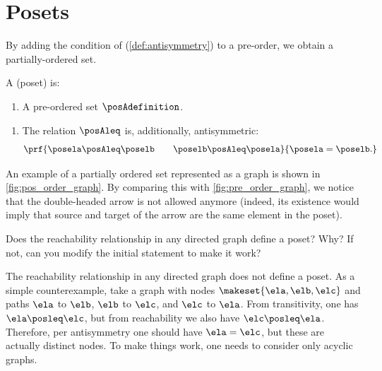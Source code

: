 
\section{Posets}
\label{sec:posets}


\begin{marginfigure}
    \centering
    \caption{A partial order represented as a graph.}
    \label{fig:pos_order_graph}
\end{marginfigure}
By adding the condition of \emph{} (\cref{def:antisymmetry}) to a pre-order, we obtain a partially-ordered set.

\begin{ctdefinition}
    \label{def:poset}
    A  (poset) is:

    \constit
    \begin{enumerate}
        \item A pre-ordered set $\posAdefinition$.
    \end{enumerate}

    \condit
    \begin{enumerate}
        \item The relation $\posAleq$ is, additionally, antisymmetric:
              \begin{equation}
                  \prf{
                      \posela \posAleq \poselb \qquad \poselb \posAleq \posela
                  }{
                      \posela = \poselb .
                  }
              \end{equation}
    \end{enumerate}
\end{ctdefinition}

An example of a partially ordered set represented as a graph is shown in \cref{fig:pos_order_graph}.
By comparing this with \cref{fig:pre_order_graph}, we notice that the double-headed arrow is not allowed anymore (indeed, its existence would imply that source and target of the arrow are the same element in the poset).

\begin{exercise}
    \label{ex:reachabilityposet}
    Does the reachability relationship in any directed graph define a poset?
    Why?
    If not, can you modify the initial statement to make it work?
\end{exercise}
\begin{solution}
    The reachability relationship in any directed graph does not define a poset.
    As a simple counterexample, take a graph with nodes $\makeset{\ela,\elb,\elc}$ and paths $\ela$ to $\elb$, $\elb$ to $\elc$, and $\elc$ to $\ela$.
    From transitivity, one has $\ela \posleq \elc$, but from reachability we also have $\elc\posleq \ela$.
    Therefore, per antisymmetry one should have $\ela=\elc$, but these are actually distinct nodes.
    To make things work, one needs to consider only acyclic graphs.
\end{solution}

